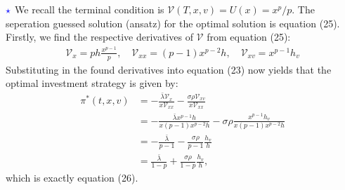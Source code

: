 \documentclass[11pt]{article}
\numberwithin{equation}{section}
\begin{document}
$\textcolor{blue}{\star}$ We recall the terminal condition is
$\mathcal{V}(T,x,v)=U(x)=x^p/p$. The seperation guessed solution (ansatz) for
the optimal solution is equation (25). Firstly, we find the respective
derivatives of $\mathcal{V}$ from equation (25):
\begin{align*}
    \mathcal{V}_x=ph\frac{x^{p-1}}{p},\quad \mathcal{V}_{xx}=(p-1)x^{p-2}h, \quad \mathcal{V}_{xv}=x^{p-1}h_v
\end{align*}
Substituting in the found derivatives into equation (23) now yields that the
optimal investment strategy is given by:
\begin{align*}
    \pi^*(t,x,v)&=-\frac{\bar{\lambda} \mathcal{V}_x}{x \mathcal{V}_{xx}} - \frac{\sigma\rho \mathcal{V}_{xv}}{x \mathcal{V}_{xx}}\\
    &=-\frac{\bar{\lambda} x^{p-1}h}{x(p-1)x^{p-2}h}-\sigma\rho\frac{x^{p-1}h_v}{x(p-1)x^{p-2}h}\\
    &=-\frac{\bar{\lambda} }{p-1}-\frac{\sigma\rho}{p-1}\frac{h_v}{h}\\
    &=\frac{\bar{\lambda} }{1-p}+\frac{\sigma\rho}{1-p}\frac{h_v}{h},
\end{align*}
which is exactly equation (26).
\end{document}
